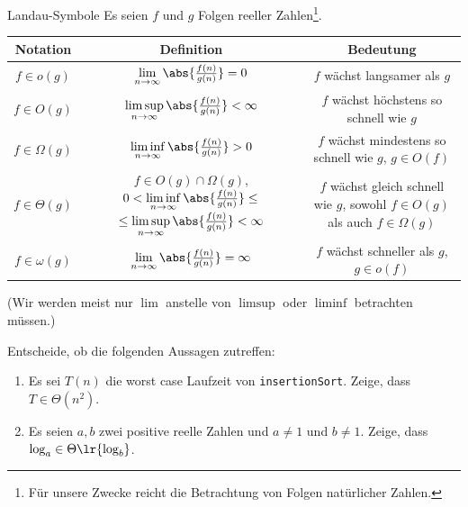 \begin{frame}{Landau-Symbole}
	Es seien $f$ und $g$ Folgen reeller Zahlen\footnote{Für unsere Zwecke reicht die Betrachtung von Folgen natürlicher Zahlen.}.\\
	\vspace{0.5cm}
	\centering
	\small
	\begin{tabular}{|c|c|c|}
		\hline
		\textbf{Notation} & \textbf{Definition}                                              & \textbf{Bedeutung}                                  \\
		\hline
		$f \in o(g)$      & $\lim\limits_{n \to \infty} \abs{\frac{f(n)}{g(n)}} = 0$         & $f$ wächst langsamer als $g$                        \\
		\hline
		$f \in O(g)$      & $\limsup\limits_{n \to \infty} \abs{\frac{f(n)}{g(n)}} < \infty$ & $f$ wächst höchstens so schnell wie $g$             \\
		\hline
		$f \in \Omega(g)$ & $\liminf\limits_{n \to \infty} \abs{\frac{f(n)}{g(n)}} > 0$      & \makecell{$f$ wächst mindestens so schnell wie $g$, \\$g\in O(f)$}                          \\
		\hline
		$f \in \Theta(g)$ & \makecell{$f \in O(g)\cap \Omega(g)$,                                                                                  \\ $0 < \liminf\limits_{n \to \infty} \abs{\frac{f(n)}{g(n)}} \leq$ \\ $\leq\limsup\limits_{n \to \infty} \abs{\frac{f(n)}{g(n)}} < \infty$} & \makecell{$f$ wächst gleich schnell wie $g$,        \\sowohl $f\in O(g)$ als auch $f\in\Omega(g)$} \\
		\hline
		$f \in \omega(g)$ & $\lim\limits_{n \to \infty} \abs{\frac{f(n)}{g(n)}} = \infty$    & \makecell{$f$ wächst schneller als $g$,             \\$g\in o(f)$}                                      \\
		\hline
	\end{tabular}
	(Wir werden meist nur $\lim$ anstelle von $\limsup$ oder $\liminf$ betrachten müssen.)
\end{frame}

\begin{frame}
	\begin{myexercise}\label{myexercise:complexity00}
		Entscheide, ob die folgenden Aussagen zutreffen:
		\begin{enumerate}
			\item Es sei $T(n)$ die worst case Laufzeit von \texttt{insertionSort}. Zeige, dass $T\in\Theta(n^2)$.
			\item Es seien $a, b$ zwei positive reelle Zahlen und $a\neq 1$ und $b\neq 1$. Zeige, dass $\log_a\in\Theta\lr{\log_b}$.
		\end{enumerate}
	\end{myexercise}
\end{frame}

